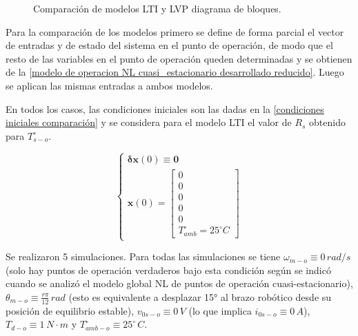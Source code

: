 \documentclass[a4paper, 10pt, onecolumn,journal]{ieeeconf}
\begin{document}
\begin{figure}[thpb]
	\centering
	\begin{adjustbox}{max width=\columnwidth}
	\end{adjustbox}
	\caption{Comparación de modelos LTI y LVP diagrama de bloques.}
	\label{diagrama de bloques LPV vs LTI}
\end{figure}

Para la comparación de los modelos primero se define de forma parcial el vector de entradas y de estado del sistema en el punto de operación,
de modo que el resto de las variables en el punto de operación queden determinadas y se obtienen de la \cref{modelo de operacion NL cuasi_estacionario desarrollado reducido}. Luego se aplican
las mismas entradas a ambos modelos.

En todos los casos, las condiciones iniciales son las dadas en la \cref{condiciones iniciales comparación} y se considera para 
el modelo LTI el valor de $R_s$ obtenido para $T^\circ_{s-o}$.

\begin{equation}
	\begin{cases}
		\mathbf{\delta x}(0) \equiv \mathbf{0}\\
		\mathbf{x}(0) 
		=
		\begin{bmatrix} 
			0 \\ 
			0 \\ 
			0 \\ 
			0 \\ 
			0 \\ 
			T^\circ_{amb} = 25^\circ C
		\end{bmatrix}
	\end{cases}
	\label{condiciones iniciales comparación}
\end{equation}

Se realizaron 5 simulaciones. Para todas las simulaciones se tiene 
$\omega_{m-o} \equiv 0\,rad/s$ (solo hay puntos de operación verdaderos bajo esta condición según
se indicó cuando se analizó el modelo global NL de puntos de operación cuasi-estacionario), $\theta_{m-o}\equiv \frac{r\pi}{12}\,rad$ (esto
es equivalente a desplazar 15° al brazo robótico desde su posición de equilibrio estable), $v_{0s-o} \equiv 0\,V$ (lo que implica $i_{0s-o}\equiv 0\, A$), $T_{d-o} \equiv 1\, N\cdot m$
y $T^\circ_{amb-o}\equiv 25^\circ\, C$.
\end{document}
